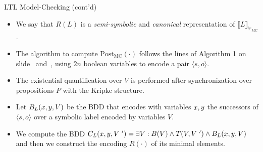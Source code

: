 \documentclass[12pt]{beamer}
\begin{document}
\begin{frame}{LTL Model-Checking (cont'd)}
	\begin{itemize}
		\item We say that $R(L)$ is a \textit{semi-symbolic} and \textit{canonical} representation of $\llbracket L \rrbracket_{\succeq_{\text{MC}}}$.
		\item The algorithm
		to compute $\text{Post}_{\text{MC}}(\cdot)$ follows the lines of Algorithm 1 on slide~\pageref{Algorithm1_part1} and~\pageref{Algorithm1_part2}, using $2n$ boolean variables
		to encode a pair $\langle s, o \rangle$.
		\item The existential quantification over $V$ is performed after synchronization over propositions $P$ with the Kripke structure.
		\item Let $B_{L}(\mathnormal{x}, \mathnormal{y}, V)$ be the
		BDD that encodes with variables $\mathnormal{x}, \mathnormal{y}$ the successors of $\langle s, o \rangle$ over a symbolic label encoded by variables $V$.
		\item We compute the BDD $C_{L}(\mathnormal{x}, \mathnormal{y}, V~') = \exists V : B(V) \land T(V, V~') \land B_{L}(\mathnormal{x}, \mathnormal{y}, V)$ and then we construct the encoding $R(\cdot)$ of its minimal elements.
	\end{itemize}
\end{frame}
\end{document}
